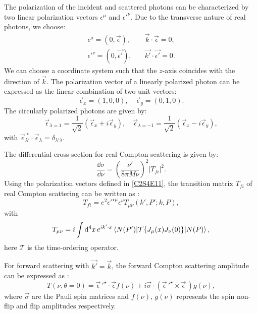 The polarization of the incident and scattered photons can be characterized by two linear polarization vectors $\epsilon^\mu$ and $\epsilon'^\nu$. Due to the transverse nature of real photons, we choose:
\begin{equation} \label{C2S4E11}
\begin{split}
\epsilon^\mu = (0,\vec{\epsilon}), & \quad \vec{k}\cdot\vec{\epsilon} = 0, \\
\epsilon'^\nu = (0,\vec{\epsilon'}), & \quad \vec{k'}\cdot\vec{\epsilon'} = 0.
\end{split}
\end{equation}
We can choose a coordinate system such that the $z$-axis coincides with the direction of $\vec{k}$. The polarization vector of a linearly polarized photon can be expressed as the linear combination of two unit vectors:
\begin{equation} \label{C2S4E12}
\vec{\epsilon}_x = (1,0,0), \quad \vec{\epsilon}_y = (0,1,0).
\end{equation}
The circularly polarized photons are given by:
\begin{equation} \label{C2S4E13}
\vec{\epsilon}_{\lambda=1} = \frac{1}{\sqrt{2}}(\vec{\epsilon}_x+i\vec{\epsilon}_y), \quad \vec{\epsilon}_{\lambda=-1} = \frac{1}{\sqrt{2}}(\vec{\epsilon}_x-i\vec{\epsilon}_y),
\end{equation}
with $\vec{\epsilon}^{\;\star}_{\lambda'}\cdot\vec{\epsilon}_{\lambda}=\delta_{\lambda'\lambda}$.

The differential cross-section for real Compton scattering is given by:
\begin{equation} \label{C2S4E14}
\frac{\dd{\sigma}}{\dd{\nu}} = \left(\frac{\nu'}{8\pi M\nu}\right)^2|T_{fi}|^2.
\end{equation}
Using the polarization vectors defined in \cref{C2S4E11}, the transition matrix $T_{fi}$ of real Compton scattering can be written as \cite{Thomas2001}:
\begin{equation} \label{C2S4E15}
T_{fi} = e^2\epsilon'^{\star\mu}\epsilon^\nu T_{\mu\nu}(k',P';k,P),
\end{equation}
with
\begin{equation} \label{C2S4E16}
T_{\mu\nu} = i\int\dd[4]{x}e^{ik'\cdot x}\mel{N(P')}{\mathcal{T}\{J_\mu(x)J_\nu(0)\}}{N(P)},
\end{equation}
here $\mathcal{T}$ is the time-ordering operator.

For forward scattering with $\vec{k'}=\vec{k}$, the forward Compton scattering amplitude can be expressed as \cite{Drechsel2003}:
\begin{equation} \label{C2S4E17}
T(\nu,\theta=0) = \vec{\epsilon}\,'^\star\cdot\vec{\epsilon}f(\nu)+i\vec{\sigma}\cdot(\vec{\epsilon}\,'^\star\times\vec{\epsilon}\,)g(\nu),
\end{equation}
where $\vec{\sigma}$ are the Pauli spin matrices and $f(\nu)$, $g(\nu)$ represents the spin non-flip and flip amplitudes respectively.

